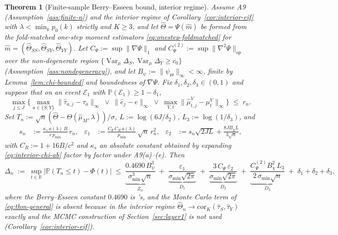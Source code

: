 \documentclass[11pt]{article}
\theoremstyle{plain}
\newtheorem{theorem}{Theorem}[section]
\theoremstyle{definition}
\theoremstyle{remark}
\newcommand{\PP}{\mathbb{P}}
\newcommand{\R}{\mathbb{R}}
\newcommand{\Qhat}{\widehat{\mu}_M}
\newcommand{\Thetahat}{\widehat{\Theta}}
\newcommand{\Corr}{\mathrm{cor}}
\DeclareMathOperator{\Var}{Var}
\begin{document}
\begin{theorem}[Finite-sample Berry--Esseen bound, interior regime]\label{thm:finite-n}
Assume A9 (Assumption~\ref{ass:finite-n}) and the interior regime of
Corollary~\ref{cor:interior-eif} with $\lambda<\min_kp_0(k)$ strictly and $K\ge3$, and
let $\hat\Theta=\Psi(\hat m)$ be formed from the fold-matched one-step moment estimators
\eqref{eq:onestep-foldmatched} for $\hat m=(\hat\Theta_{SS},\hat\Theta_{SY},\hat\Theta_{YY})$.
Let $C_\Psi:=\sup\|\nabla\Psi\|_1$ and $C_{\Psi}^{(2)}:=\sup\|\nabla^2\Psi\|_{op}$ over
the non-degenerate region $\{\Var_\mu\Delta_S,\Var_\mu\Delta_Y\ge c_0\}$
(Assumption~\ref{ass:nondegeneracy}), and let $B_\psi:=\|\psi_\Theta\|_\infty<\infty$,
finite by Lemma~\ref{lem:chi-bounded} and boundedness of $\nabla\Psi$. Fix
$\delta_1,\delta_2,\delta_3\in(0,1)$ and suppose that on an event $\mathcal E_1$ with
$\PP(\mathcal E_1)\ge1-\delta_1$,
\[
    \max_{j\le J}\Big\{\max_{a\in\{S,Y\}}\|\hat\tau_{a,j}-\tau_a\|_\infty\;\vee\;\|\hat e_j-e\|_\infty\;\vee\;\max_{V,t}\|\hat\mu^V_{t,j}-\mu^V_t\|_\infty\Big\}\;\le\;r_n .
\]
Set $T_n:=\sqrt n(\hat\Theta-\Theta(\Qhat,\lambda))/\sigma$, $L:=\log(6J/\delta_2)$,
$L_3:=\log(1/\delta_3)$, and
\begin{align}
    s_n&:=\frac{\kappa_s\,a(\lambda)\,B}{c\,p_{\min}}\,r_n, &
    \varepsilon_1&:=\frac{C_\Psi\,C_R\,a(\lambda)}{p_{\min}}\,\sqrt n\,r_n^2, &
    \varepsilon_2&:=s_n\sqrt{2JL}+\frac{8JB_\chi L}{3\sqrt n},\label{eq:eps-defs}
\end{align}
with $C_R:=1+16B/c^2$ and $\kappa_s$ an absolute constant obtained by expanding
\eqref{eq:interior-chi-ab} factor by factor under A9(a)--(e). Then
\begin{equation}\label{eq:finite-n-bound}
    \Delta_n\;:=\;\sup_{t\in\R}\big|\PP(T_n\le t)-\Phi(t)\big|
    \;\le\;\underbrace{\frac{0.4690\,B_\psi^3}{\sigma_{\min}^3\sqrt n}}_{Z_n}
    \;+\;\underbrace{\frac{\varepsilon_1}{\sigma_{\min}\sqrt{2\pi}}}_{D_1}
    \;+\;\underbrace{\frac{3\,C_\Psi\,\varepsilon_2}{\sigma_{\min}\sqrt{2\pi}}}_{D_2}
    \;+\;\underbrace{\frac{C^{(2)}_\Psi B_\chi^2\,L_3}{2\,\sigma_{\min}\sqrt n}}_{D_3}
    \;+\;\delta_1+\delta_2+\delta_3 ,
\end{equation}
where the Berry--Esseen constant $0.4690$ is \citet{Shevtsova2011}'s, and the Monte Carlo
term of \eqref{eq:thm-general} is absent because in the interior regime
$\Thetahat_n\to\Corr_K(\hat\tau_S,\hat\tau_Y)$ exactly and the MCMC construction of
Section~\ref{sec:layer1} is not used (Corollary~\ref{cor:interior-eif}).


\end{theorem}
\end{document}
